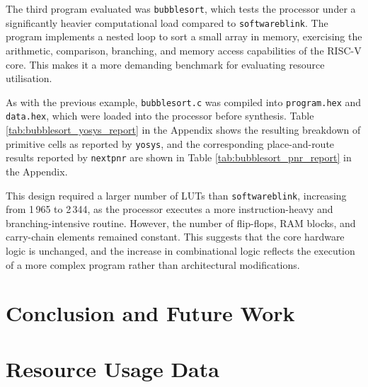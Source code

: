 \documentclass[a4paper,10pt]{article}
\begin{document}
The third program evaluated was \texttt{bubblesort}, 
which tests the processor under a significantly 
heavier computational load compared to \texttt{softwareblink}. 
The program implements a nested loop to sort a small array in memory, 
exercising the arithmetic, comparison, branching, 
and memory access capabilities of the RISC-V core. 
This makes it a more demanding benchmark for 
evaluating resource utilisation.

As with the previous example, 
\texttt{bubblesort.c} was compiled into 
\texttt{program.hex} and \texttt{data.hex}, 
which were loaded into the processor before synthesis. 
Table \ref{tab:bubblesort_yosys_report} in the Appendix
shows the resulting breakdown of 
primitive cells as reported by \texttt{yosys},
and the corresponding place-and-route results reported by 
\texttt{nextpnr} are shown in 
Table \ref{tab:bubblesort_pnr_report} in the Appendix.

This design required a larger number of LUTs than 
\texttt{softwareblink}, increasing from 1\,965 to 2\,344, 
as the processor executes a more instruction-heavy and 
branching-intensive routine. 
However, the number of flip-flops, RAM blocks, 
and carry-chain elements remained constant. 
This suggests that the core hardware logic is unchanged, 
and the increase in combinational logic reflects 
the execution of a more complex program 
rather than architectural modifications.

\section{Conclusion and Future Work}
\label{sec:Conclusion_and_Future_Work}

\appendix
\label{Appendix}
\section{Resource Usage Data}
\end{document}

